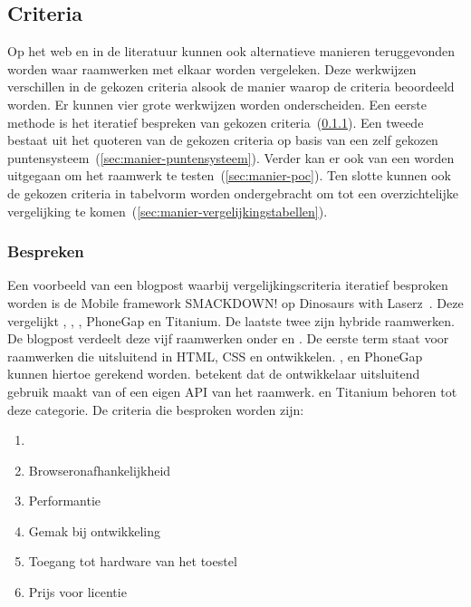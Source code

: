 \subsection{Criteria}
\label{sec:vergelijken-criteria}
Op het web en in de literatuur kunnen ook alternatieve manieren teruggevonden worden waar raamwerken met elkaar worden vergeleken.  
Deze werkwijzen verschillen in de gekozen criteria alsook de manier waarop de criteria beoordeeld worden.
Er kunnen vier grote werkwijzen worden onderscheiden.
Een eerste methode is het iteratief bespreken van gekozen criteria~(\ref{sec:manier-bespreken}).
Een tweede bestaat uit het quoteren van de gekozen criteria op basis van een zelf gekozen puntensysteem~(\ref{sec:manier-puntensysteem}).
Verder kan er ook van een  worden uitgegaan om het raamwerk te testen~(\ref{sec:manier-poc}).
Ten slotte kunnen ook de gekozen criteria in tabelvorm worden ondergebracht om tot een overzichtelijke vergelijking te komen~(\ref{sec:manier-vergelijkingstabellen}).

\subsubsection{Bespreken}
\label{sec:manier-bespreken}
Een voorbeeld van een blogpost waarbij vergelijkingscriteria iteratief besproken worden is de Mobile framework SMACKDOWN! op Dinosaurs with Laserz~\cite{Rozynski2011}.
Deze vergelijkt \jqt{},  \jqm{},  \st{},  PhoneGap en Titanium.  
De laatste twee zijn hybride raamwerken.
De blogpost verdeelt deze vijf raamwerken onder  en .
De eerste term staat voor raamwerken die uitsluitend in HTML, CSS en \js{} ontwikkelen. 
\jqt{},  \jqm{} en PhoneGap kunnen hiertoe gerekend worden.
 betekent dat de ontwikkelaar uitsluitend gebruik maakt van \js{} of een eigen API van het raamwerk.
\st{} en Titanium behoren tot deze categorie.
De criteria die besproken worden zijn:
\begin{enumerate}
 \item {}
 \item Browseronafhankelijkheid
 \item Performantie
 \item Gemak bij ontwikkeling
 \item Toegang tot hardware van het toestel
 \item Prijs voor licentie
\end{enumerate}

